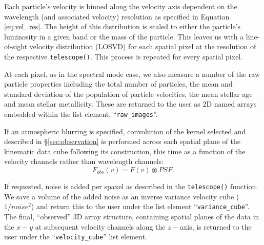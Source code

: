 \documentclass[
  journal=pasa,
  manuscript=research-paper, %
  year=2020,
  volume=37,
]{cup-journal}
\newcommand{\telescope}[1]{\texttt{telescope()}#1}
\newcommand{\br}[1]{\textcolor{red}{\textbf{#1}}}
\begin{document}
Each particle's velocity is binned along the velocity axis dependent on the wavelength (and associated velocity) resolution as specified in Equation \ref{eq:vel_res}. 
The height of this distribution is scaled to either the particle's luminosity in a given band or the mass of the particle. 
This leaves us with a line-of-sight velocity distribution (LOSVD) for each spatial pixel at the resolution of the respective \telescope. 
This process is repeated for every spatial pixel. 

At each pixel, as in the spectral mode case, we also measure a number of the raw particle properties including the total number of particles, the mean and standard deviation of the population of particle velocities, the mean stellar age and mean stellar metallicity. These are returned to the user as 2D named arrays embedded within the list element, ``\texttt{raw\_images}''.

If an atmospheric blurring is specified, convolution of the kernel selected and described in \S \ref{sec:observation} is performed across each spatial plane of the kinematic data cube following its construction, this time as a function of the velocity channels rather than wavelength channels:
\begin{equation}
    F_{obs}(v) = F(v) \circledast PSF.
\end{equation}

If requested, noise is added per spaxel as described in the \telescope{} function. 
We save a volume of the added noise as an inverse variance velocity cube ($1/noise^{2}$) and return this to the user under the list element ``\texttt{variance\_cube}''. 
The final, ``observed'' 3D array structure, containing spatial planes of the data in the $x-y$ at subsequent velocity channels along the $z-$axis, is returned to the user under the ``\texttt{velocity\_cube}'' list element. 
\end{document}
